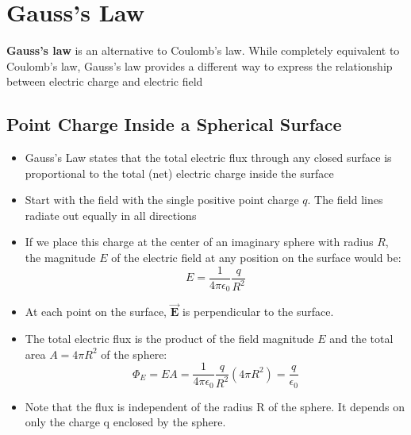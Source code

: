 \documentclass[11pt, a4paper]{article}
\begin{document}
\section[22.3, Gauss's Law]{Gauss's Law}
\textbf{Gauss's law} is an alternative to Coulomb's law. While completely equivalent to Coulomb's
law, Gauss's law provides a different way to express the relationship between electric
charge and electric field
\subsection{Point Charge Inside a Spherical Surface}
\begin{itemize}
    \item Gauss's Law states that the total electric flux through any closed surface is
        proportional to the total (net) electric charge inside the surface
    \item Start with the field with the single positive point charge $q$. The field lines
        radiate out equally in all directions
    \item If we place this charge at the center of an imaginary sphere with radius $R$,
        the magnitude $E$ of the electric field at any position on the surface would be:
        \begin{equation}
            E = \frac{1}{4\pi\epsilon_0}\frac{q}{R^2}
        \end{equation}
    \item At each point on the surface, $\vec{\mathbf{E}}$ is perpendicular to the
        surface.
    \item The total electric flux is the product of the field magnitude $E$ and the total
        area $A = 4\pi R^2$ of the sphere:
        \begin{equation}
            \Phi_E = EA =  \frac{1}{4\pi\epsilon_0}\frac{q}{R^2}(4\pi R^2) =
            \frac{q}{\epsilon_0}
        \end{equation}
    \item Note that the flux is independent of the radius R of the sphere.
        It depends on only the charge q enclosed by the sphere.
\end{itemize}
\end{document}
